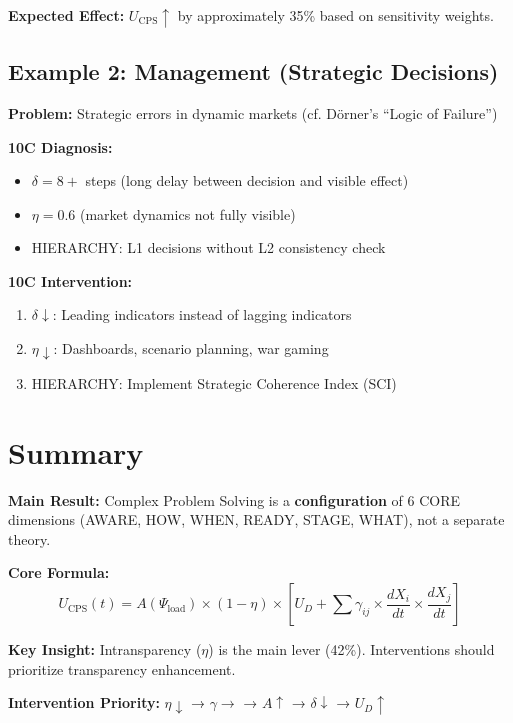 \textbf{Expected Effect:} $U_{\text{CPS}} \uparrow$ by approximately 35\% based on sensitivity weights.


\subsection{Example 2: Management (Strategic Decisions)}

\textbf{Problem:} Strategic errors in dynamic markets (cf. Dörner's ``Logic of Failure'')

\textbf{10C Diagnosis:}
\begin{itemize}
\item $\delta = 8+$ steps (long delay between decision and visible effect)
\item $\eta = 0.6$ (market dynamics not fully visible)
\item HIERARCHY: L1 decisions without L2 consistency check
\end{itemize}

\textbf{10C Intervention:}
\begin{enumerate}
\item $\delta \downarrow$: Leading indicators instead of lagging indicators
\item $\eta \downarrow$: Dashboards, scenario planning, war gaming
\item HIERARCHY: Implement Strategic Coherence Index (SCI)
\end{enumerate}



\section{Summary}
\label{sec:cps-summary}

\begin{tcolorbox}[colback=green!5!white, colframe=green!75!black,
    title=Summary: CPS in the EBF]

\textbf{Main Result:} Complex Problem Solving is a \textbf{configuration} of 6 CORE dimensions (AWARE, HOW, WHEN, READY, STAGE, WHAT), not a separate theory.

\textbf{Core Formula:}
\begin{equation*}
U_{\text{CPS}}(t) = A(\Psi_{\text{load}}) \times (1-\eta) \times \left[U_D + \sum \gamma_{ij} \times \frac{dX_i}{dt} \times \frac{dX_j}{dt}\right]
\end{equation*}

\textbf{Key Insight:} Intransparency ($\eta$) is the main lever (42\%). Interventions should prioritize transparency enhancement.

\textbf{Intervention Priority:} $\eta \downarrow$ → $\gamma \rightarrow$ → $A \uparrow$ → $\delta \downarrow$ → $U_D \uparrow$

\end{tcolorbox}



